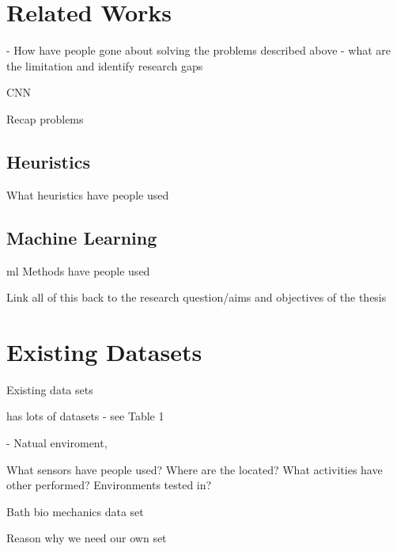 \section{Related Works} - %
How have people gone about solving the problems described above - what are the limitation and identify research gaps

CNN \cite{Martinez-Hernandez2021}

Recap problems


\subsection{Heuristics}
What heuristics have people used

\subsection{Machine Learning} %
\acrshort{ml} Methods have people used


Link all of this back to the research question/aims and objectives of the thesis


\section{Existing Datasets} %
Existing data sets

\cite{Cruciani2020} has lots of datasets - see Table 1

\cite{Vaizman2017} - Natual enviroment,

\cite{Fu2021}

What sensors have people used? Where are the located? What activities have other performed? Environments tested in?

Bath bio mechanics data set

Reason why we need our own set


